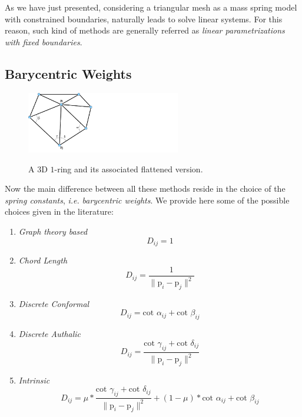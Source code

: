 \documentclass{InsightArticle}
\def \ie {\textit{i.e. }}
\newcommand \vect[1]{\boldsymbol{\mathrm{#1}}}
\begin{document}
As we have just presented, considering a triangular mesh as a mass spring model with constrained boundaries, naturally leads to solve linear systems. For this reason, such kind of methods are generally referred as \emph{linear parametrizations with fixed boundaries}.

\subsection{Barycentric Weights}
\label{sec:BarycentricWeights}

\begin{figure}
\centering
\includegraphics[width=0.6\textwidth]{param}\label{fig:angle_description}
\caption{A $3$D $1$-ring and its associated flattened version.}
\end{figure}

Now the main difference between all these methods reside in the choice of the \emph{spring constants}, \ie \emph{barycentric weights}. We provide here some of the possible choices given in the literature:
\begin{enumerate}
    \item \emph{Graph theory based}~\cite{Tutte60,Tutte63} 
\begin{equation}
    D_{ij} = 1
\end{equation}
    \item \emph{Chord Length}~\cite{} 
\begin{equation}
    D_{ij} = \frac{1}{\|\vect{p}_i - \vect{p}_j\|^2}    
\end{equation}
    \item \emph{Discrete Conformal}~\cite{pinkall93computing} 
\begin{equation}
    D_{ij} = \text{cot }\alpha_{ij} + \text{cot }\beta_{ij}
\end{equation}
    \item \emph{Discrete Authalic}~\cite{Desbrun02}
\begin{equation}
    D_{ij} = \frac{\text{cot }\gamma_{ij} + \text{cot }\delta_{ij} }{\|\vect{p}_i - \vect{p}_j\|^2}
\end{equation}
    \item \emph{Intrinsic}~\cite{Desbrun02}
\begin{equation}
    D_{ij} = \mu * \frac{\text{cot }\gamma_{ij} + \text{cot }\delta_{ij} }{\|\vect{p}_i - \vect{p}_j\|^2} + ( 1- \mu) * 
\text{cot }\alpha_{ij} + \text{cot }\beta_{ij}
\end{equation}
\end{enumerate}
\end{document}
